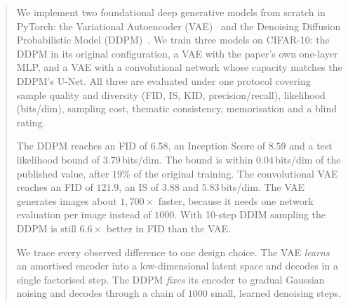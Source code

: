 \begin{abstract}
\noindent
We implement two foundational deep generative models from scratch in PyTorch: the Variational Autoencoder
(VAE)~\citep{kingma2014vae} and the Denoising Diffusion Probabilistic Model (DDPM)~\citep{ho2020ddpm}. We train
three models on CIFAR-10: the DDPM in its original configuration, a VAE with the paper's own one-layer MLP, and a VAE
with a convolutional network whose capacity matches the DDPM's U-Net. All three are evaluated under one protocol
covering sample quality and diversity (FID, IS, KID, precision/recall), likelihood (bits/dim), sampling cost,
thematic consistency, memorisation and a blind rating.

The DDPM reaches an FID of $6.58$, an Inception Score of $8.59$ and a test likelihood bound of $3.79$\,bits/dim. The
bound is within $0.04$\,bits/dim of the published value, after $19\%$ of the original training. The convolutional
VAE reaches an FID of $121.9$, an IS of $3.88$ and $5.83$\,bits/dim. The VAE generates images about
$1{,}700\times$ faster, because it needs one network evaluation per image instead of $1000$. With 10-step DDIM
sampling the DDPM is still $6.6\times$ better in FID than the VAE.

We trace every observed difference to one design choice. The VAE \emph{learns} an amortised encoder into a
low-dimensional latent space and decodes in a single factorised step. The DDPM \emph{fixes} its encoder to gradual
Gaussian noising and decodes through a chain of $1000$ small, learned denoising steps.
\end{abstract}
